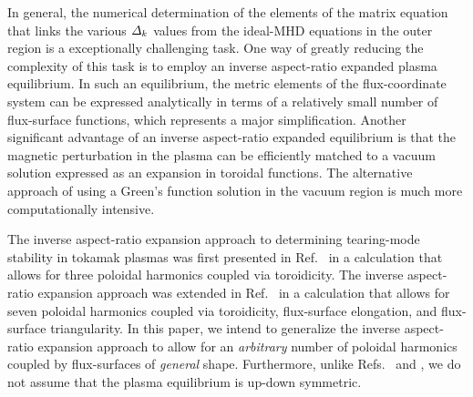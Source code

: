 \documentclass[12pt,prb,aps]{revtex4-1}
\begin{document}
In general, the  numerical determination of the elements of the matrix equation that links the various ${\mit\Delta}_k$ values from the ideal-MHD equations 
in the outer region is a exceptionally challenging task.\cite{nish,pletz,am2,aglas,aglas1}
One way of greatly reducing the complexity of this task is to employ an inverse aspect-ratio expanded plasma equilibrium.\cite{greene} In such an equilibrium,
the metric elements of the flux-coordinate system can be expressed analytically in terms of a relatively small number of  flux-surface functions,
which represents a major simplification.\cite{con0} Another significant advantage of an inverse aspect-ratio expanded equilibrium is that the magnetic perturbation in the plasma can be efficiently 
matched to a vacuum solution  expressed as an expansion in toroidal functions.\cite{am1} The alternative approach of using a Green's
function solution in the vacuum region is much more computationally intensive.\cite{chance,xu}

 The inverse aspect-ratio expansion approach to determining tearing-mode stability in tokamak plasmas 
was first presented in Ref.~ in a calculation that allows for three  poloidal harmonics coupled via toroidicity. 
The
inverse aspect-ratio expansion approach was extended in Ref.~ in a calculation that allows for seven poloidal harmonics coupled via toroidicity, flux-surface elongation, and
flux-surface triangularity. In this paper, we intend to generalize the inverse aspect-ratio expansion  approach to allow for an {\em arbitrary}\/ number of poloidal harmonics coupled
by flux-surfaces of {\em general}\/ shape. Furthermore, unlike Refs.~ and , we do not assume that the plasma
equilibrium 
is up-down symmetric. 
\end{document}
